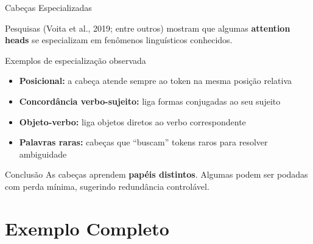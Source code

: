 \documentclass[aspectratio=169,xcolor=dvipsnames]{beamer}
\begin{document}

\begin{frame}{Cabeças Especializadas}

Pesquisas (Voita et al., 2019; entre outros) mostram que algumas \textbf{attention heads} se especializam em fenômenos linguísticos conhecidos.

\vspace{6pt}

\begin{block}{Exemplos de especialização observada}
\begin{itemize}
    \item \textbf{Posicional:} a cabeça atende sempre ao token na mesma posição relativa
    \item \textbf{Concordância verbo-sujeito:} liga formas conjugadas ao seu sujeito
    \item \textbf{Objeto-verbo:} liga objetos diretos ao verbo correspondente
    \item \textbf{Palavras raras:} cabeças que ``buscam'' tokens raros para resolver ambiguidade
\end{itemize}
\end{block}

\vspace{6pt}

\begin{exampleblock}{Conclusão}
As cabeças aprendem \textbf{papéis distintos}. Algumas podem ser podadas com perda mínima, sugerindo redundância controlável.
\end{exampleblock}

\end{frame}

\section{Exemplo Completo}
\end{document}
